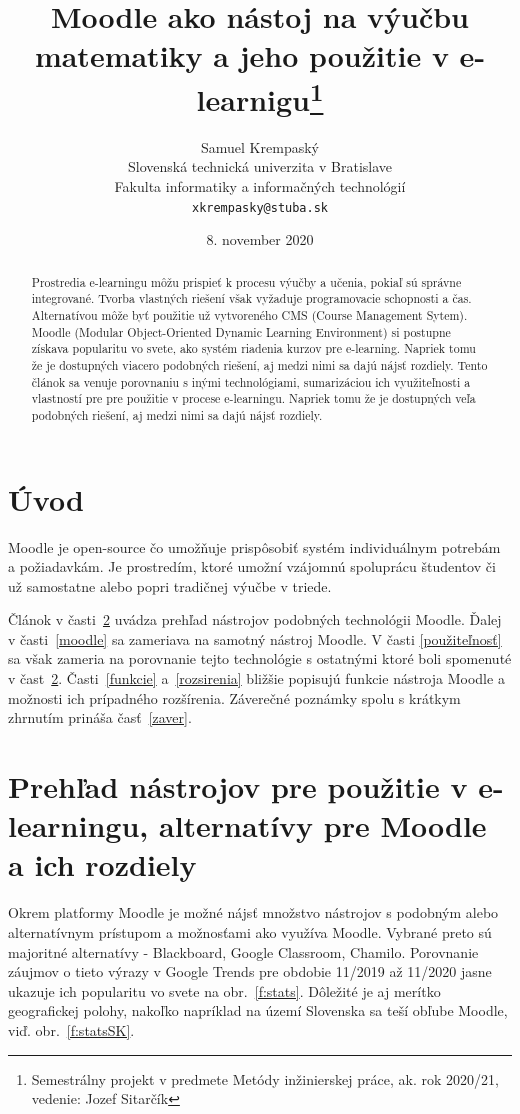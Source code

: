 \documentclass[10pt,twoside,slovak,a4paper]{article}
\title{Moodle ako nástoj na výučbu matematiky a jeho použitie v e-learnigu\thanks{Semestrálny projekt v predmete Metódy inžinierskej práce, ak. rok 2020/21, vedenie: Jozef Sitarčík}} %
\author{Samuel Krempaský\\[2pt]
	{\small Slovenská technická univerzita v Bratislave}\\
	{\small Fakulta informatiky a informačných technológií}\\
	{\small \texttt{xkrempasky@stuba.sk}}
	}
\date{\small 8. november 2020} %
\begin{document}
\maketitle

\begin{abstract}
Prostredia e-learningu môžu prispieť k procesu výučby a učenia, pokiaľ sú správne integrované. Tvorba vlastných riešení však vyžaduje programovacie schopnosti a čas. Alternatívou môže byť 
použitie už vytvoreného CMS (Course Management Sytem). Moodle (Modular Object-Oriented Dynamic Learning Environment) si postupne získava popularitu vo svete, ako systém riadenia kurzov pre e-learning. Napriek tomu že je dostupných viacero podobných riešení, aj medzi nimi sa dajú nájsť rozdiely. Tento článok sa venuje porovnaniu s inými technológiami, sumarizáciou ich využiteľnosti a vlastností pre pre použitie v procese e-learningu. Napriek tomu že je dostupných veľa podobných riešení, aj medzi nimi sa dajú nájsť rozdiely.
\end{abstract}



\section{Úvod}

Moodle je open-source čo umožňuje prispôsobiť systém individuálnym potrebám a požiadavkám. Je prostredím, ktoré umožní vzájomnú spoluprácu študentov či už samostatne alebo popri tradičnej výučbe v triede.

Článok v časti~\ref{porovnanie} uvádza prehľad nástrojov podobných technológii Moodle. Ďalej v časti~\ref{moodle} sa zameriava na samotný nástroj Moodle. V časti \ref{použiteľnosť} sa však zameria na porovnanie tejto technológie s ostatnými ktoré boli spomenuté v čast~\ref{porovnanie}. Časti~\ref{funkcie} a~\ref{rozsirenia} bližšie popisujú funkcie nástroja Moodle a možnosti ich prípadného rozšírenia. Záverečné poznámky spolu s krátkym zhrnutím prináša časť~\ref{zaver}.



\section{Prehľad nástrojov pre použitie v e-learningu, alternatívy pre Moodle a ich rozdiely} \label{porovnanie}
Okrem platformy Moodle je možné nájsť množstvo nástrojov s podobným alebo alternatívnym prístupom a možnosťami ako využíva Moodle. Vybrané preto sú majoritné alternatívy - Blackboard, Google Classroom, Chamilo. Porovnanie záujmov o tieto výrazy v Google Trends pre obdobie 11/2019 až 11/2020 jasne ukazuje ich popularitu vo svete na obr.~\ref{f:stats}. Dôležité je aj merítko geografickej polohy, nakoľko napríklad na území Slovenska sa teší obľube Moodle, viď. obr.~\ref{f:statsSK}. 
\end{document}
